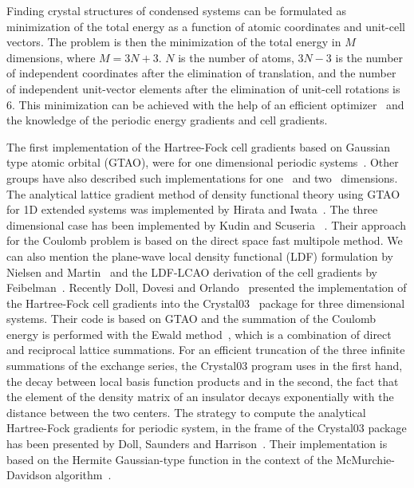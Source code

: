 \documentclass[prl,twocolumn,showpacs,twocolumngrid,superbib]{revtex4}
\begin{document}
Finding crystal structures of condensed systems can
be formulated as minimization of the total energy 
as a function of atomic coordinates and unit-cell vectors.
The problem is then the minimization of the total energy in $M$ dimensions, where
$M=3N+3$. $N$ is the number of atoms, $3N-3$ is the number
of independent coordinates after the elimination of translation, 
and the number of independent unit-vector elements
after the elimination of unit-cell rotations is 6.
This minimization can be achieved with the help of an efficient optimizer~\cite{KNemeth04,KNemeth05}
and the knowledge of the periodic energy gradients and cell gradients. 
                                  
The first implementation of the Hartree-Fock cell gradients based on 
Gaussian type atomic orbital (GTAO),
were for one dimensional periodic systems~\cite{HTeramae83,HTeramae84}. 
Other groups have also described such implementations for 
one~\cite{DJacquemin99A,DJacquemin99B} and two~\cite{MTobita03} dimensions. 
The analytical lattice gradient method of density functional theory using GTAO for 
1D extended systems was implemented by Hirata and Iwata~\cite{SHirata98}.
The three dimensional case has been implemented by Kudin and Scuseria 
~\cite{KKudin00A,KKudin00B}. Their approach for the Coulomb problem is 
based on the direct space fast multipole method.
We can also mention the plane-wave local density functional (LDF) formulation
by Nielsen and Martin~\cite{ONielsen85} and the LDF-LCAO derivation of 
the cell gradients by Feibelman~\cite{PFeibelman91}.
Recently Doll, Dovesi and Orlando~\cite{KDoll04} presented 
the implementation of the Hartree-Fock cell gradients into 
the {\sc Crystal03}~\cite{RDovesi00} package for three dimensional systems. 
Their code is based on GTAO and the summation 
of the Coulomb energy is performed with the Ewald method~\cite{PEwald21}, 
which is a combination of direct and reciprocal lattice summations.
For an efficient truncation of the three infinite summations of the exchange
series, the {\sc Crystal03} program uses in the first hand, the decay between local basis function 
products and in the second, the fact that the element of the density 
matrix of an insulator decays exponentially with the distance between 
the two centers.
The strategy to compute the analytical Hartree-Fock gradients for 
periodic system, in the frame of the {\sc Crystal03} package has been 
presented by Doll, Saunders and Harrison~\cite{KDoll01}.
Their implementation is based on the Hermite Gaussian-type function
in the context of the McMurchie-Davidson algorithm~\cite{LMcmurchie78}.
\end{document}
